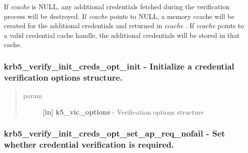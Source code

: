 \documentclass[letterpaper,10pt,english]{sphinxmanual}
\begin{document}
If \emph{ccache} is NULL, any additional credentials fetched during the verification process will be destroyed. If \emph{ccache} points to NULL, a memory ccache will be created for the additional credentials and returned in \emph{ccache} . If \emph{ccache} points to a valid credential cache handle, the additional credentials will be stored in that cache.


\subsubsection{krb5\_verify\_init\_creds\_opt\_init -  Initialize a credential verification options structure.}
\label{appdev/refs/api/krb5_verify_init_creds_opt_init:krb5-verify-init-creds-opt-init-initialize-a-credential-verification-options-structure}\label{appdev/refs/api/krb5_verify_init_creds_opt_init::doc}

\begin{fulllineitems}
\label{appdev/refs/api/krb5_verify_init_creds_opt_init:c.krb5_verify_init_creds_opt_init}
\end{fulllineitems}

\begin{quote}\begin{description}
\item[{param}] \leavevmode
\textbf{{[}in{]}} \textbf{k5\_vic\_options} - Verification options structure

\end{description}\end{quote}


\subsubsection{krb5\_verify\_init\_creds\_opt\_set\_ap\_req\_nofail -  Set whether credential verification is required.}
\label{appdev/refs/api/krb5_verify_init_creds_opt_set_ap_req_nofail::doc}\label{appdev/refs/api/krb5_verify_init_creds_opt_set_ap_req_nofail:krb5-verify-init-creds-opt-set-ap-req-nofail-set-whether-credential-verification-is-required}

\begin{fulllineitems}
\label{appdev/refs/api/krb5_verify_init_creds_opt_set_ap_req_nofail:c.krb5_verify_init_creds_opt_set_ap_req_nofail}
\end{fulllineitems}
\end{document}
